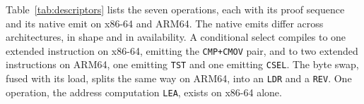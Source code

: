 Table~\ref{tab:descriptors} lists the seven operations, each with its proof sequence and its native emit on x86-64 and ARM64.
The native emits differ across architectures, in shape and in availability.
A conditional select compiles to one extended instruction on x86-64, emitting the \texttt{CMP+CMOV} pair, and to two extended instructions on ARM64, one emitting \texttt{TST} and one emitting \texttt{CSEL}.
The byte swap, fused with its load, splits the same way on ARM64, into an \texttt{LDR} and a \texttt{REV}.
One operation, the address computation \texttt{LEA}, exists on x86-64 alone.



